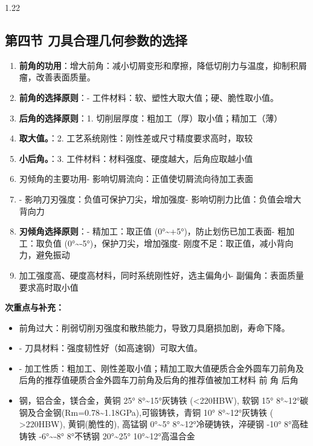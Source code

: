 \documentclass[12pt,a4paper]{article}
\begin{document}
\begin{spacing}{1.22}
\subsection{第四节 刀具合理几何参数的选择}
\begin{tcolorbox}[colback=yellow!6,colframe=red!55!black,title=重点,left=1mm,right=1mm]
\begin{enumerate}[leftmargin=2.2em,label=\arabic*.]
  \item \textbf{前角的功用}：增大前角：减小切屑变形和摩擦，降低切削力与温度，抑制积屑瘤，改善表面质量。
  \item \textbf{前角的选择原则}：- 工件材料：软、塑性大取大值；硬、脆性取小值。
  \item \textbf{后角的选择原则}：1. 切削层厚度：粗加工（厚）取小值；精加工（薄）
  \item \textbf{取大值。}：2. 工艺系统刚性：刚性差或尺寸精度要求高时，取较
  \item \textbf{小后角。}：3. 工件材料：材料强度、硬度越大，后角应取越小值
  \item 刃倾角的主要功用- 影响切屑流向：正值使切屑流向待加工表面
  \item - 影响刀刃强度：负值可保护刀尖，增加强度- 影响切削力比值：负值会增大背向力
  \item \textbf{刃倾角选择原则}：- 精加工：取正值 (0°\textasciitilde{}+5°)，防止划伤已加工表面- 粗加工：取负值 (0°\textasciitilde{}-5°)，保护刀尖，增加强度- 刚度不足：取正值，减小背向力，避免振动
  \item 加工强度高、硬度高材料，同时系统刚性好，选主偏角小- 副偏角：表面质量要求高时取小值
\end{enumerate}
\end{tcolorbox}
\noindent\textbf{次重点与补充：}
\begin{itemize}[leftmargin=2.2em,label=--]
  \item 前角过大：削弱切削刃强度和散热能力，导致刀具磨损加剧，寿命下降。
  \item - 刀具材料：强度韧性好（如高速钢）可取大值。
  \item - 加工性质：粗加工、刚性差取小值；精加工取大值硬质合金外圆车刀前角及后角的推荐值硬质合金外圆车刀前角及后角的推荐值被加工材料 前 角 后角
  \item 钢，铝合金，镁合金，黄铜 25° 8°\textasciitilde{}15°灰铸铁 (<220HBW), 软钢 15° 8°\textasciitilde{}12°碳钢及合金钢(Rm=0.78\textasciitilde{}1.18GPa),可锻铸铁，青铜 10° 8°\textasciitilde{}12°灰铸铁 ( >220HBW), 黄铜(脆性的), 高锰钢 0°\textasciitilde{}5° 8°\textasciitilde{}12°冷硬铸铁，淬硬钢 -10° 8°高硅铸铁 -6°\textasciitilde{}-8° 8°不锈钢 20°\textasciitilde{}25° 10°\textasciitilde{}12°高温合金

\end{itemize}
\end{spacing}
\end{document}
